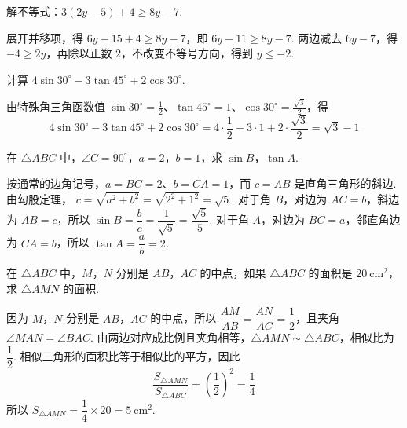 \begin{problem}
解不等式：\(3\left(2y-5\right)+4\geqslant8y-7\).
\end{problem}

\begin{solution}
展开并移项，得 \(6y-15+4\geqslant8y-7\)，即 \(6y-11\geqslant8y-7\). 两边减去 \(6y-7\)，得 \(-4\geqslant2y\)，再除以正数 \(2\)，不改变不等号方向，得到 \(y\leqslant-2\).
\end{solution}

\begin{problem}
计算 \(4\sin30^\circ-3\tan45^\circ+2\cos30^\circ\).
\end{problem}

\begin{solution}
由特殊角三角函数值
\(\sin30^\circ=\frac12\)、\(\tan45^\circ=1\)、\(\cos30^\circ=\frac{\sqrt{3}}2\)，得
\[
4\sin30^\circ-3\tan45^\circ+2\cos30^\circ=4\cdot\frac12-3\cdot1+2\cdot\frac{\sqrt{3}}2=\sqrt{3}-1
\]
\end{solution}

\begin{problem}
在 \(\triangle ABC\) 中，\(\angle C=90^\circ\)，\(a=2\)，\(b=1\)，求 \(\sin B\)，\(\tan A\).
\end{problem}

\begin{solution}
按通常的边角记号，\(a=BC=2\)、\(b=CA=1\)，而 \(c=AB\) 是直角三角形的斜边. 由勾股定理，
\(c=\sqrt{a^2+b^2}=\sqrt{2^2+1^2}=\sqrt5\). 对于角 \(B\)，对边为 \(AC=b\)，斜边为 \(AB=c\)，所以
\(\sin B=\dfrac{b}{c}=\dfrac1{\sqrt5}=\dfrac{\sqrt5}{5}\). 对于角 \(A\)，对边为 \(BC=a\)，邻直角边为 \(CA=b\)，所以 \(\tan A=\dfrac{a}{b}=2\).
\end{solution}

\begin{problem}
在 \(\triangle ABC\) 中，\(M\)，\(N\) 分别是 \(AB\)，\(AC\) 的中点，如果 \(\triangle ABC\) 的面积是 \(20\mathrm{~cm}^2\)，求 \(\triangle AMN\) 的面积.
\end{problem}

\begin{solution}
因为 \(M\)，\(N\) 分别是 \(AB\)，\(AC\) 的中点，所以
\(\dfrac{AM}{AB}=\dfrac{AN}{AC}=\dfrac12\)，且夹角 \(\angle MAN=\angle BAC\). 由两边对应成比例且夹角相等，\(\triangle AMN\sim\triangle ABC\)，相似比为 \(\dfrac12\). 相似三角形的面积比等于相似比的平方，因此
\[
\frac{S_{\triangle AMN}}{S_{\triangle ABC}}=\left(\frac12\right)^2=\frac14
\]
所以 \(S_{\triangle AMN}=\dfrac14\times20=5\mathrm{~cm}^2\).
\end{solution}


